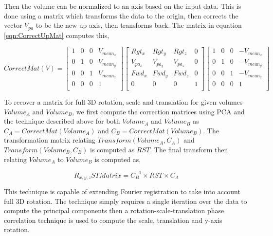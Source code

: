 Then the volume can be normalized to an axis based on the input data. This is done using a matrix which transforms the data to the origin, then corrects the vector $V_{pa}$ to be the new up axis, then transforms back. The matrix in equation \ref{eqn:CorrectUpMat} computes this,


\begin{equation} \label{eqn:CorrectUpMat}
CorrectMat(V) = \left[
\begin{array}{cccc}
1 & 0 & 0 & V_{mean_x} \\
0 & 1 & 0 & V_{mean_y} \\
0 & 0 & 1 & V_{mean_z} \\
0 & 0 & 0 & 1 \\
\end{array}
\right] \left[
\begin{array}{cccc}
Rgt_x & Rgt_y & Rgt_z & 0 \\
V_{pa_x} & V_{pa_y} & V_{pa_z} & 0 \\
Fwd_x & Fwd_y & Fwd_z & 0 \\
0 & 0 & 0 & 1 \\
\end{array}
\right] \left[
\begin{array}{cccc}
1 & 0 & 0 & -V_{mean_x} \\
0 & 1 & 0 & -V_{mean_y} \\
0 & 0 & 1 & -V_{mean_z} \\
0 & 0 & 0 & 1 \\
\end{array}
\right]
\end{equation}


To recover a matrix for full 3D rotation, scale and translation for given volumes $Volume_A$ and $Volume_B$, we first compute the correction matrices using PCA and the technique described above for both $Volume_A$ and $Volume_B$ as $C_A = CorrectMat(Volume_A)$ and $C_B = CorrectMat(Volume_B)$. The transformation matrix relating $Transform(Volume_A, C_A)$ and $Transform(Volume_B, C_B)$ is computed as $RST$. The final transform then relating $Volume_A$ to $Volume_B$ is computed as,

\begin{equation} \label{eqn:FullRSTTransform}
R_{x,y,z}ST Matrix = C_{B}^{-1} \times RST \times C_A
\end{equation}

This technique is capable of extending Fourier registration to take into account full 3D rotation. The technique simply requires a single iteration over the data to compute the principal components then a rotation-scale-translation phase correlation technique is used to compute the scale, translation and y-axis rotation. 

